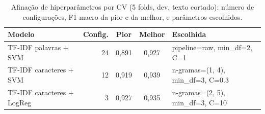 \begin{table}[t]\centering\scriptsize
\caption{Afinação de hiperparâmetros por CV (5 folds, dev, texto cortado): número de configurações, F1-macro da pior e da melhor, e parâmetros escolhidos.}\label{tab:tuning}
\begin{tabular}{lrccl}
\toprule
Modelo & Config. & Pior & Melhor & Escolhida \\
\midrule
TF-IDF palavras + SVM & 24 & 0,891 & 0,927 & pipeline=raw, min\_df=2, C=1 \\
TF-IDF caracteres + SVM & 12 & 0,919 & 0,939 & n-gramas=(1, 4), min\_df=3, C=0.3 \\
TF-IDF caracteres + LogReg & 3 & 0,927 & 0,935 & n-gramas=(2, 5), min\_df=3, C=10 \\
\bottomrule
\end{tabular}
\end{table}
